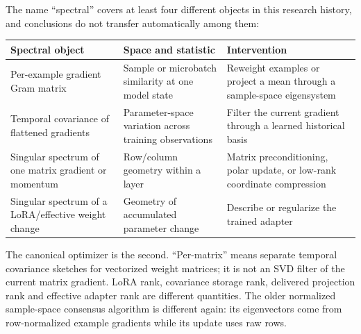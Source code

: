 \documentclass[
  british,
  10pt,
  a4paper,
]{article}
\newcounter{none} %
\begin{document}
The name ``spectral'' covers at least four different objects in this
research history, and conclusions do not transfer automatically among
them:

{\def\LTcaptype{none} %
\begin{longtable}[]{@{}
  >{\raggedright\arraybackslash}p{}
  >{\raggedright\arraybackslash}p{}
  >{\raggedright\arraybackslash}p{}@{}}
\toprule\noalign{}
\begin{minipage}[b]{\linewidth}\raggedright
Spectral object
\end{minipage} & \begin{minipage}[b]{\linewidth}\raggedright
Space and statistic
\end{minipage} & \begin{minipage}[b]{\linewidth}\raggedright
Intervention
\end{minipage} \\
\midrule\noalign{}
\endhead
\bottomrule\noalign{}
\endlastfoot
Per-\allowbreak{}example gradient Gram matrix & Sample or microbatch
similarity at one model state & Reweight examples or project a mean
through a sample-\allowbreak{}space eigensystem \\
Temporal covariance of flattened gradients &
Parameter-\allowbreak{}space variation across training observations &
Filter the current gradient through a learned historical basis \\
Singular spectrum of one matrix gradient or momentum & Row/column
geometry within a layer & Matrix
precondition\allowbreak{}ing,\allowbreak{} polar update, or low-rank
coordinate compression \\
Singular spectrum of a LoRA/\allowbreak{}effective weight change &
Geometry of accumulated parameter change & Describe or regularize the
trained adapter \\
\end{longtable}
}

The canonical optimizer is the second. “Per-\allowbreak{}matrix” means
separate temporal covariance sketches for vectorized weight matrices; it
is not an SVD filter of the current matrix gradient. LoRA rank,
covariance storage rank, delivered projection rank and effective adapter
rank are different quantities.\allowbreak{} The older normalized
sample-\allowbreak{}space consensus algorithm is different again: its
eigenvectors come from row-\allowbreak{}normalized example gradients
while its update uses raw rows.
\end{document}
